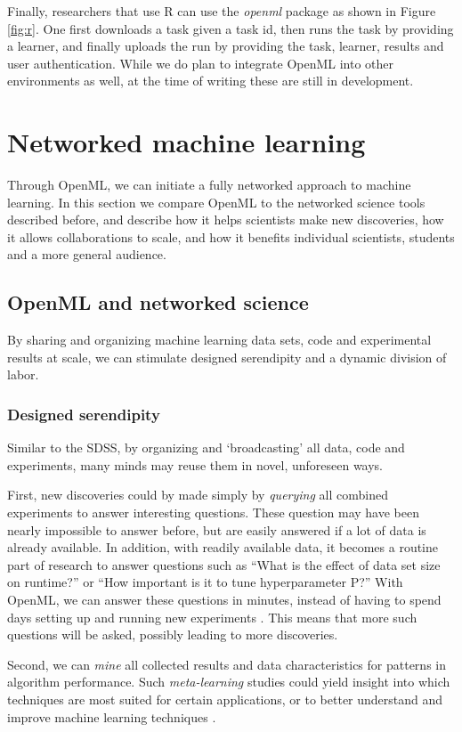 \documentclass{acmproc-sp}
\begin{document}
Finally, researchers that use R can use the \textit{openml} package as shown in Figure \ref{fig:r}. One first downloads a task given a task id, then runs the task by providing a learner, and finally uploads the run by providing the task, learner, results and user authentication. While we do plan to integrate OpenML into other environments as well, at the time of writing these are still in development. 

\newpage
\section{Networked machine learning}
\label{benefits}
Through OpenML, we can initiate a fully networked approach to machine learning. In this section we compare OpenML to the networked science tools described before, and describe how it helps scientists make new discoveries, how it allows collaborations to scale, and how it benefits individual scientists, students and a more general audience.

\subsection{OpenML and networked science}
\label{promise}
By sharing and organizing machine learning data sets, code and experimental results at scale, we can stimulate designed serendipity and a dynamic division of labor.

\subsubsection{Designed serendipity}
Similar to the SDSS, by organizing and `broadcasting' all data, code and experiments, many minds may reuse them in novel, unforeseen ways. 

First, new discoveries could by made simply by \textit{querying} all combined experiments to answer interesting questions. These question may have been nearly impossible to answer before, but are easily answered if a lot of data is already available. In addition, with readily available data, it becomes a routine part of research to answer questions such as ``What is the effect of data set size on runtime?'' or ``How important is it to tune hyperparameter P?'' With OpenML, we can answer these questions in minutes, instead of having to spend days setting up and running new experiments \cite{Vanschoren12}. This means that more such questions will be asked, possibly leading to more discoveries.

Second, we can \textit{mine} all collected results and data characteristics for patterns in algorithm performance. Such \textit{meta-learning} studies could yield insight into which techniques are most suited for certain applications, or to better understand and improve machine learning techniques \cite{Vanschoren12}.
\end{document}
